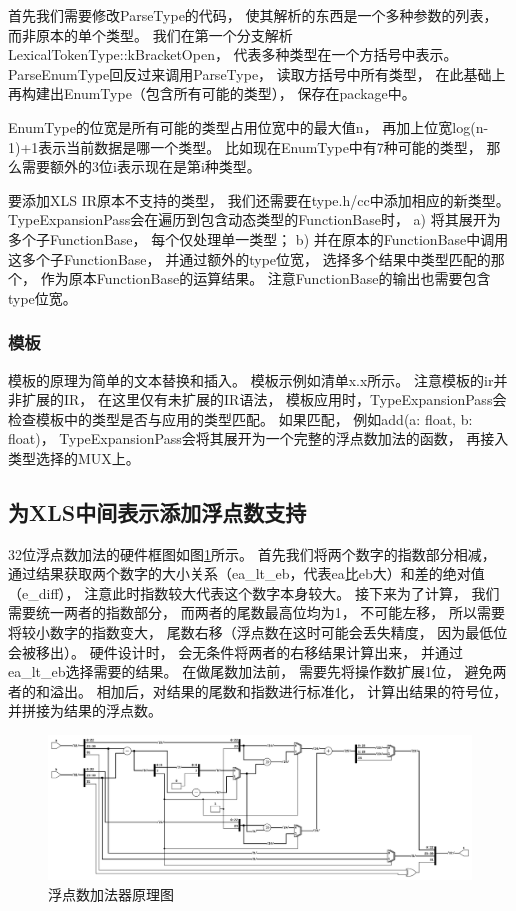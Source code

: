 首先我们需要修改ParseType的代码，
使其解析的东西是一个多种参数的列表，
而非原本的单个类型。
我们在第一个分支解析LexicalTokenType::kBracketOpen，
代表多种类型在一个方括号中表示。
ParseEnumType回反过来调用ParseType，
读取方括号中所有类型，
在此基础上再构建出EnumType（包含所有可能的类型），
保存在package中。

EnumType的位宽是所有可能的类型占用位宽中的最大值n，
再加上位宽log(n-1)+1表示当前数据是哪一个类型。
比如现在EnumType中有7种可能的类型，
那么需要额外的3位i表示现在是第i种类型。

要添加XLS IR原本不支持的类型，
我们还需要在type.h/cc中添加相应的新类型。
TypeExpansionPass会在遍历到包含动态类型的FunctionBase时，
a) 将其展开为多个子FunctionBase，
每个仅处理单一类型；
b) 并在原本的FunctionBase中调用这多个子FunctionBase，
并通过额外的type位宽，
选择多个结果中类型匹配的那个，
作为原本FunctionBase的运算结果。
注意FunctionBase的输出也需要包含type位宽。

\subsubsection{模板}

模板的原理为简单的文本替换和插入。
模板示例如清单x.x所示。
注意模板的ir并非扩展的IR，
在这里仅有未扩展的IR语法，
模板应用时，TypeExpansionPass会检查模板中的类型是否与应用的类型匹配。
如果匹配，
例如add(a: float, b: float)，
TypeExpansionPass会将其展开为一个完整的浮点数加法的函数，
再接入类型选择的MUX上。

\subsection{为XLS中间表示添加浮点数支持}

32位浮点数加法的硬件框图如图\ref{fig:float_add}所示。
首先我们将两个数字的指数部分相减，
通过结果获取两个数字的大小关系（ea\_lt\_eb，代表ea比eb大）和差的绝对值（e\_diff），
注意此时指数较大代表这个数字本身较大。
接下来为了计算，
我们需要统一两者的指数部分，
而两者的尾数最高位均为1，
不可能左移，
所以需要将较小数字的指数变大，
尾数右移（浮点数在这时可能会丢失精度，
因为最低位会被移出）。
硬件设计时，
会无条件将两者的右移结果计算出来，
并通过ea\_lt\_eb选择需要的结果。
在做尾数加法前，
需要先将操作数扩展1位，
避免两者的和溢出。
相加后，对结果的尾数和指数进行标准化，
计算出结果的符号位，
并拼接为结果的浮点数。

\begin{figure}[h]
\centering
\includegraphics[width=\linewidth]{figure/float_add.png}
\caption{浮点数加法器原理图}
\label{fig:float_add}
\end{figure}

